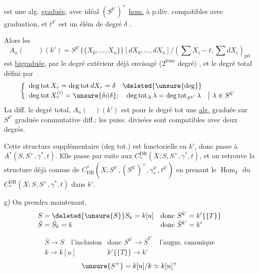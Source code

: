 est une alg.  \uline{graduée}, avec idéal $(S^{k'})^+$ \uline{hom.} à p.div. compatibles avec graduation, et $t^{k'}$ est un élém de degré $\delta$ .

Alors les
\[
 A_n(\qquad)(k')=S^{k'}\{\{X_0,\ldots,X_n\}\}[dX_0,\ldots,dX_n]/(\textstyle\sum X_i-t,\sum dX_i)_{\mathrm{pd}}
\]
 est \uline{bigraduée}, par le degré extérieur déjà envisagé ($2^{\text{ième}}$ degré) , et le degré total défini par
\[
\left\{\begin{array}{l}
\deg\operatorname{tot}X_r=\deg\operatorname{tot}dX_r=\delta\quad\deleted{\unsure{\deg}}\\
\deg\operatorname{tot}X_r^{(i)}=\unsure{\delta i|\delta};\quad\deg\operatorname{tot}_A\lambda=\deg\operatorname{tot}_{S^{k'}}\lambda\quad\big|\ \lambda\in S^{k'}
\end{array}\right.
\]
La diff.   le degré total, $A_n(\quad)(k')$ est pour le degré tot une \uline{alg.} graduée sur $S^{k'}$ graduée commutative diff.; les puiss. divisées sont compatibles avec deux degrés.

Cette structure supplémentaire (deg tot.) est  fonctorielle en $k'$, donc passe à $A^*(S,S^+,\gamma^*,t)$. Elle passe par suite aux $C_*^{\mathrm{DR}}(X;S,S^+,\gamma^*,t)$, et on retrouve la structure déjà connue de $C^*_{\mathrm{DR}}(X;S^{k'},(S^{k'})^+,\gamma_*^{k'},t^{k'})$ en prenant le $\operatorname{Hom}_k$ du  $C_*^{\mathrm{DR}}(X;S,S^+,\gamma^*,t)$ dans $k'$.

g) On prendra maintenant, 
\[
\begin{array}{ll}
S=\deleted{\unsure{S}}S_k=k[u]&\text{donc }S^{k'}=k'\{\{T\}\}\\
\bar S=\bar S_k=k&\text{donc }\bar S^{k'}=k'
\end{array}
\]
\[
\begin{array}{ll}
\bar S\longrightarrow S\quad\text{l'inclusion}&\text{donc }S^{k'}\longrightarrow\bar S^{k'}\quad\text{l'augm. canonique}\\
k\longrightarrow k[u]&k'\{\{T\}\}\longrightarrow k'
\end{array}
\]
\[
 \unsure{S^+}=k[u]/k\simeq k[u]^+
\]
